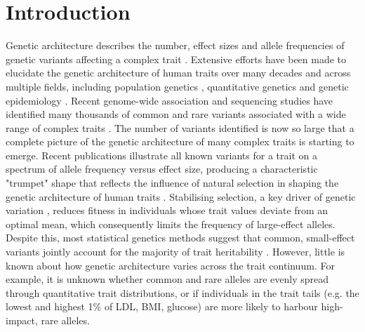 \documentclass[12pt]{zHenriquesLab-StyleBioRxiv}
\begin{document}
\section*{Introduction}  \label{sec:intro}  
Genetic architecture describes the number, effect sizes and allele frequencies of genetic 
variants affecting a complex trait \cite{Timpson2018}. Extensive efforts have been made 
to elucidate the genetic architecture of human traits over many decades and across multiple fields, 
including population genetics \cite{Oconnor2019}, quantitative genetics \cite{Polderman2015} 
and genetic epidemiology \cite{Abdellaoui2023}. Recent genome-wide association and sequencing 
studies have identified many thousands of common and rare variants associated with a 
wide range of complex traits \cite{Abdellaoui2023,Flannick2019,Singh2022}. The number of variants 
identified is now so large that a complete picture of the genetic architecture of 
many complex traits is starting to emerge. Recent publications illustrate all known 
variants for a trait on a spectrum of allele frequency versus effect size, producing a 
characteristic "trumpet" shape \cite{Yengo2022,Corte2023} that reflects the influence of natural selection
in shaping the genetic architecture of human traits \cite{Oconnor2019,Koch2024}. 
Stabilising selection, a key driver of genetic variation \cite{Oconnor2019,Simons2018}, 
reduces fitness in individuals whose trait values deviate from an optimal mean, which consequently limits 
the frequency of large-effect alleles. Despite this, most statistical genetics methods 
suggest that common, small-effect variants jointly account for the majority of 
trait heritability \cite{Golan2014,Wainschtein2022,Weiner2023}. However, little is 
known about how genetic architecture varies across the trait continuum. 
For example, it is unknown whether common and rare alleles are evenly spread through 
quantitative trait distributions, or if individuals in the trait 
tails (e.g. the lowest and highest 1\% of LDL, BMI, glucose) are more likely to harbour high-impact, rare alleles.
\end{document}
